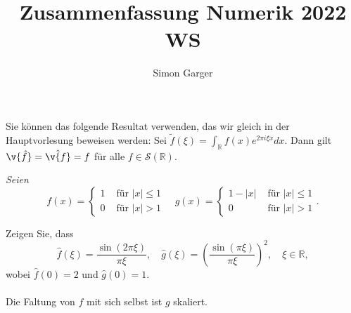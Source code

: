 \documentclass[11pt]{article}
\title{Zusammenfassung Numerik 2022 WS}
\author{Simon Garger}
\newenvironment{problem}[2][Beispiel]{
    \begin{trivlist}
        \item[\hskip \labelsep {\bfseries #1}\hskip \labelsep {\bfseries #2.}] \itshape}{
    \end{trivlist}\normalshape
}
\begin{document}
    Sie können das folgende Resultat verwenden, das wir gleich in der
    Hauptvorlesung beweisen werden: Sei $\tilde{f}(\xi)=\int_{\mathbb{R}}
    f(x) e^{2 \pi i \xi x} d x$. Dann gilt $\v{\hat{f}}=\hat{\v{f}}=f$
    für alle $f \in \mathcal{S}(\mathbb{R})$.

    \begin{problem}{1}
        Seien
        $$
        f(x)=\left\{\begin{array}{ll}
                        1 & \text { für }|x| \leq 1 \\
                        0 & \text { für }|x|>1
        \end{array} \quad g(x)=\left\{\begin{array}{ll}
                                          1-|x| & \text { für }|x| \leq 1 \\
                                          0 & \text { für }|x|>1
        \end{array} .\right.\right.
        $$

        Zeigen Sie, dass
        $$
        \hat{f}(\xi)=\frac{\sin (2 \pi \xi)}{\pi \xi}, \quad \hat{g}(\xi)=
        \left(\frac{\sin (\pi \xi)}{\pi \xi}\right)^2, \quad \xi \in \mathbb{R},
        $$
        wobei $\hat{f}(0)=2$ und $\hat{g}(0)=1$.\\\\
        Die Faltung von $f$ mit sich selbst ist $g$ skaliert.
    \end{problem}
\end{document}
